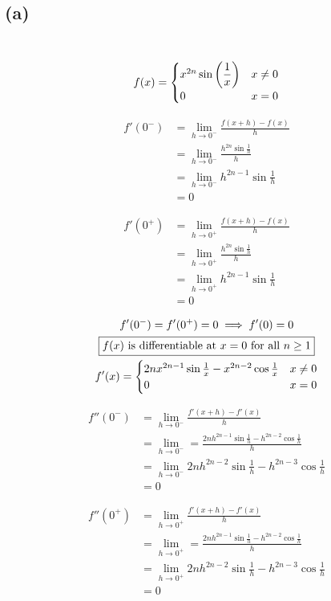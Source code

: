 \documentclass[12pt]{article}
\newcommand*{\paren}[1]{\ensuremath\left(#1\right)}
\newcommand{\subproblem}[1]{\subsection{(#1)} \,}
\begin{document}
\subproblem{a}
\[
f(x)=\begin{cases}
    x^{2n} \sin \paren{ \dfrac{1}{x}} &x\ne 0\\
    0 &x=0
\end{cases}
\]
\begin{minipage}[t]{0.5\linewidth}
    \begin{align*}
        f'(0^-)&=\lim_{h\to0^-} \frac{f(x+h)-f(x)}{h}\\
        &= \lim_{h\to0^-} \frac{h^{2n}\sin \frac{1}{h}}{h}\\
        &=\lim_{h\to0^-} h^{2n-1} \sin \frac{1}{h}\\
        &=0
    \end{align*}
\end{minipage}
\begin{minipage}[t]{0.5 \linewidth}
    \begin{align*}
        f'(0^+)&=\lim_{h\to0^+} \frac{f(x+h)-f(x)}{h}\\
        &= \lim_{h\to0^+} \frac{h^{2n}\sin \frac{1}{h}}{h}\\
        &=\lim_{h\to0^+} h^{2n-1} \sin \frac{1}{h}
        \\&=0
    \end{align*}
\end{minipage}

\begin{gather*}
    f'(0^-)=f'(0^+)=0 \implies f'(0)=0\\
    \boxed{f(x) $ is differentiable at $ x=0 $ for all $ n \ge 1}\\ 
    f'(x)=\begin{cases}
        2nx^{2n-1} \sin \frac{1}{x}-x^{2n-2} \cos \frac{1}{x} &x \ne 0\\
        0 & x=0
    \end{cases}
\end{gather*}
\begin{minipage}[t]{0.5 \linewidth}
    \begin{align*}
        f''(0^-)&=\lim_{h\to0^-} \frac{f'(x+h)-f'(x)}{h}\\
        &= \lim_{h\to0^-}=\frac{2nh^{2n-1}\sin \frac{1}{h}- h^{2n-2}\cos \frac{1}{h}}{h}\\
        &=\lim_{h\to0^-} 2nh^{2n-2} \sin \frac{1}{h}-h^{2n-3}\cos \frac{1}{h}\\
        &=0
    \end{align*}
\end{minipage}
\begin{minipage}[t]{0.5 \linewidth}
    \begin{align*}
        f''(0^+)&=\lim_{h\to0^+} \frac{f'(x+h)-f'(x)}{h}\\
        &= \lim_{h\to0^+}=\frac{2nh^{2n-1}\sin \frac{1}{h}- h^{2n-2}\cos \frac{1}{h}}{h}\\
        &=\lim_{h\to0^+} 2nh^{2n-2} \sin \frac{1}{h}-h^{2n-3}\cos \frac{1}{h}\\
        &=0
    \end{align*}
\end{minipage}
\end{document}
